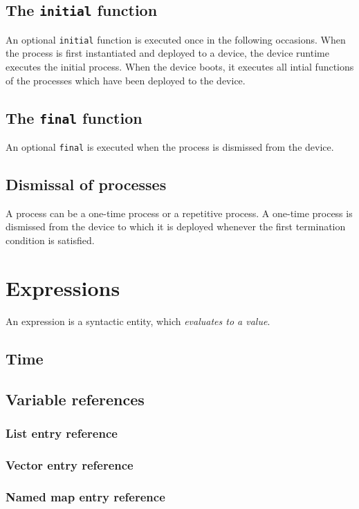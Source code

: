 \documentclass{note}\usepackage{mathptm,mydef}
\begin{document}
\subsection{The \texttt{initial} function}
An optional \verb+initial+ function is executed once in the following occasions.
\ben
\w When the process is first instantiated and deployed to a device, the device
runtime executes the initial process.
\w When the device boots, it executes all intial functions of the processes
which have been deployed to the device.
\een

\subsection{The \texttt{final} function}
An optional \verb+final+ is executed when the process is dismissed from the
device.

\subsection{Dismissal of processes}
A process can be a one-time process or a repetitive process. A one-time
process is dismissed from the device to which it is deployed whenever the
first termination condition is satisfied.


\section{Expressions}
\noindent{}An expression is a syntactic entity, which {\em evaluates to a
  value\/}. 

\subsection{Time}
\subsection{Variable references}
\subsubsection{List entry reference}
\subsubsection{Vector entry reference}
\subsubsection{Named map entry reference}
\end{document}
